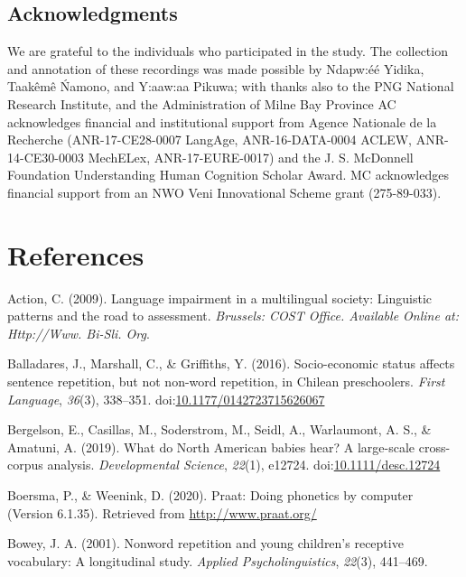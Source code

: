 \documentclass[english,,man,floatsintext]{apa6}
\begin{document}
\newpage

\subsection{Acknowledgments}\label{acknowledgments}

We are grateful to the individuals who participated in the study. The
collection and annotation of these recordings was made possible by
Ndapw:éé Yidika, Taakêmê Ńamono, and Y:aaw:aa Pikuwa; with thanks also
to the PNG National Research Institute, and the Administration of Milne
Bay Province AC acknowledges financial and institutional support from
Agence Nationale de la Recherche (ANR-17-CE28-0007 LangAge,
ANR-16-DATA-0004 ACLEW, ANR-14-CE30-0003 MechELex, ANR-17-EURE-0017) and
the J. S. McDonnell Foundation Understanding Human Cognition Scholar
Award. MC acknowledges financial support from an NWO Veni Innovational
Scheme grant (275-89-033).

\section{References}\label{references}

\setlength{\parindent}{-0.5in} \setlength{\leftskip}{0.5in}

\hypertarget{refs}{}
\hypertarget{ref-is08042009language}{}
Action, C. (2009). Language impairment in a multilingual society:
Linguistic patterns and the road to assessment. \emph{Brussels: COST
Office. Available Online at: Http://Www. Bi-Sli. Org}.

\hypertarget{ref-balladares2016socio}{}
Balladares, J., Marshall, C., \& Griffiths, Y. (2016). Socio-economic
status affects sentence repetition, but not non-word repetition, in
Chilean preschoolers. \emph{First Language}, \emph{36}(3), 338--351.
doi:\href{https://doi.org/10.1177/0142723715626067}{10.1177/0142723715626067}

\hypertarget{ref-bergelsoncasillas2019what}{}
Bergelson, E., Casillas, M., Soderstrom, M., Seidl, A., Warlaumont, A.
S., \& Amatuni, A. (2019). What do North American babies hear? A
large-scale cross-corpus analysis. \emph{Developmental Science},
\emph{22}(1), e12724.
doi:\href{https://doi.org/10.1111/desc.12724}{10.1111/desc.12724}

\hypertarget{ref-Praat}{}
Boersma, P., \& Weenink, D. (2020). Praat: Doing phonetics by computer
(Version 6.1.35). Retrieved from \url{http://www.praat.org/}

\hypertarget{ref-bowey2001nonword}{}
Bowey, J. A. (2001). Nonword repetition and young children's receptive
vocabulary: A longitudinal study. \emph{Applied Psycholinguistics},
\emph{22}(3), 441--469.
\end{document}
